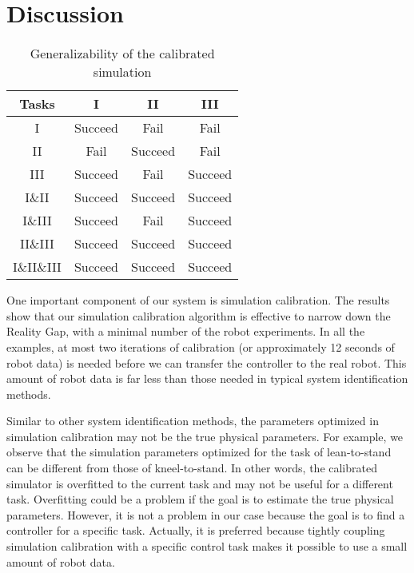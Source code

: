 \section{Discussion}
\begin{table}
  \caption{Generalizability of the calibrated simulation}
  \vspace{-0.1in}
 \label{table:generalize}
\begin{center}
\begin{tabular}{|c|c|c|c|}
\hline
 Tasks &  I &  II  &  III \\
 \hline
 I & Succeed & Fail & Fail  \\
 II & Fail & Succeed & Fail \\
 III & Succeed & Fail & Succeed \\
 I\&II & Succeed & Succeed & Succeed\\
 I\&III & Succeed & Fail & Succeed\\
 II\&III & Succeed & Succeed & Succeed \\
 I\&II\&III & Succeed & Succeed & Succeed\\
\hline
\end{tabular}
\vspace{-0.2in}
\end{center}
 \end{table}


One important component of our system is simulation calibration. The results show that our simulation calibration algorithm is effective to narrow down the Reality Gap, with a minimal number of the robot experiments. In all the examples, at most two iterations of calibration (or approximately 12 seconds of robot data) is needed before we can transfer the controller to the real robot. This amount of robot data is far less than those needed in typical system identification methods.

Similar to other system identification methods, the parameters optimized in simulation calibration may not be the true physical parameters. For example, we observe that the simulation parameters optimized for the task of lean-to-stand can be different from those of kneel-to-stand. In other words, the calibrated simulator is overfitted to the current task and may not be useful for a different task. Overfitting could be a problem if the goal is to estimate the true physical parameters. However, it is not a problem in our case because the goal is to find a controller for a specific task. Actually, it is preferred because tightly coupling simulation calibration with a specific control task makes it possible to use a small amount of robot data.

